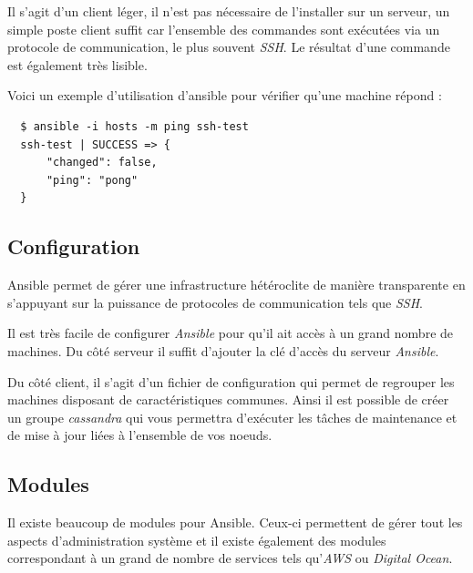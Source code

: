 \documentclass[11pt,a4paper]{article}
\begin{document}
  \bigskip

  Il s'agit d'un client léger, il n'est pas nécessaire de l'installer sur
  un serveur, un simple poste client suffit car l'ensemble des commandes
  sont exécutées via un protocole de communication, le plus souvent
  \emph{SSH}. Le résultat d'une commande est également très lisible.

  \bigskip

  Voici un exemple d'utilisation d'ansible pour vérifier qu'une machine
  répond :

  \begin{verbatim}
  $ ansible -i hosts -m ping ssh-test
  ssh-test | SUCCESS => {
      "changed": false,
      "ping": "pong"
  }
  \end{verbatim}

  \newpage

  \subsection{Configuration}\label{configuration}

  Ansible permet de gérer une infrastructure hétéroclite de manière
  transparente en s'appuyant sur la puissance de protocoles de
  communication tels que \emph{SSH}.

  \bigskip

  Il est très facile de configurer \emph{Ansible} pour qu'il ait accès à
  un grand nombre de machines. Du côté serveur il suffit d'ajouter la clé
  d'accès du serveur \emph{Ansible}.

  \bigskip

  Du côté client, il s'agit d'un fichier de configuration qui permet de
  regrouper les machines disposant de caractéristiques communes. Ainsi il
  est possible de créer un groupe \emph{cassandra} qui vous permettra
  d'exécuter les tâches de maintenance et de mise à jour liées à
  l'ensemble de vos noeuds.

  \newpage

  \subsection{Modules}\label{modules}

  Il existe beaucoup de modules pour Ansible. Ceux-ci permettent de gérer
  tout les aspects d'administration système et il existe également des
  modules correspondant à un grand de nombre de services tels
  qu'\emph{AWS} ou \emph{Digital Ocean}.

  \bigskip
\end{document}
